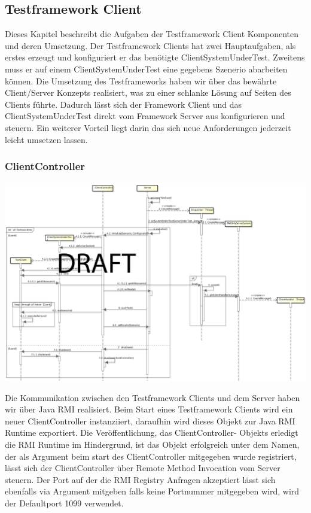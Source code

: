 \subsection{Testframework Client}
\label{sec:test-FW Client}
Dieses Kapitel beschreibt die Aufgaben der Testframework Client Komponenten und deren Umsetzung. Der Testframework Clients hat zwei Hauptaufgaben, als erstes erzeugt und konfiguriert er das benötigte ClientSystemUnderTest. Zweitens muss er auf einem ClientSystemUnderTest eine gegebens Szenerio abarbeiten können. Die Umsetzung des Testframeworks haben wir über das bewährte Client/Server Konzepts realisiert, was zu einer schlanke Lösung auf Seiten des Clients führte. Dadurch lässt sich der Framework Client und das ClientSystemUnderTest direkt vom Framework Server aus konfigurieren und steuern. Ein weiterer Vorteil liegt darin das sich neue Anforderungen jederzeit leicht umsetzen lassen.


\subsubsection{ClientController}
\label{sec:clientController}

\begin{center}
\includegraphics[scale=0.2]{image_testFramework/TestFWServerClientSeq.png}
\end{center}
 
Die Kommunikation zwischen den Testframework Clients und dem Server haben wir über Java RMI realisiert. Beim Start eines Testframework Clients wird ein neuer ClientController instanziiert, daraufhin wird dieses Objekt zur Java RMI Runtime exportiert. Die Veröffentlichung, das ClientController- Objekts erledigt die RMI Runtime im Hindergrund, ist das Objekt erfolgreich unter dem Namen, der als Argument beim start des ClientController mitgegeben wurde registriert, lässt sich der ClientController über Remote Method Invocation vom Server steuern. Der Port auf der die RMI Registry Anfragen akzeptiert lässt sich ebenfalls via Argument mitgeben falls keine Portnummer mitgegeben wird, wird der Defaultport 1099 verwendet.

